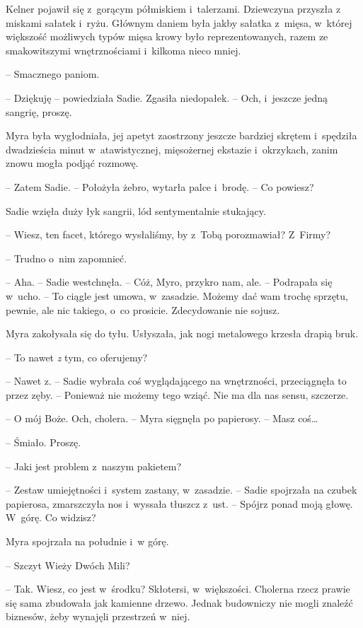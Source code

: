 \documentclass[oneside,polish,11pt,sfheadings]{mwbk}
\begin{document}
Kelner pojawił się z~gorącym półmiskiem i~talerzami. Dziewczyna przyszła
z miskami sałatek i~ryżu. Głównym daniem była jakby sałatka z~mięsa, w~której większość możliwych typów mięsa krowy było reprezentowanych, razem ze
smakowitszymi wnętrznościami i~kilkoma nieco mniej.

-- Smacznego paniom.

-- Dziękuję -- powiedziała Sadie. Zgasiła niedopałek. -- Och, i~jeszcze
jedną sangrię, proszę.

Myra była wygłodniała, jej apetyt zaostrzony jeszcze bardziej skrętem i~spędziła dwadzieścia minut w~atawistycznej, mięsożernej ekstazie i~okrzykach, zanim znowu mogła podjąć rozmowę.

-- Zatem Sadie. -- Położyła żebro, wytarła palce i~brodę. -- Co powiesz?

Sadie wzięła duży łyk sangrii, lód sentymentalnie stukający.

-- Wiesz, ten facet, którego wysłaliśmy, by z~Tobą porozmawiał? Z~Firmy?

-- Trudno o~nim zapomnieć.

-- Aha. -- Sadie westchnęła. -- Cóż, Myro, przykro nam, ale. -- Podrapała
się w~ucho. -- To ciągle jest umowa, w~zasadzie. Możemy dać wam trochę
sprzętu, pewnie, ale nic takiego, o~co prosicie. Zdecydowanie nie
sojusz.

Myra zakołysała się do tyłu. Usłyszała, jak nogi metalowego krzesła
drapią bruk.

-- To nawet \textit{z} tym, co oferujemy?

-- Nawet z. -- Sadie wybrała coś wyglądającego na wnętrzności,
przeciągnęła to przez zęby. -- Ponieważ nie możemy tego wziąć. Nie ma dla
nas sensu, szczerze.

-- O mój Boże. Och, cholera. -- Myra sięgnęła po papierosy. -- Masz coś\ldots

-- Śmiało. Proszę.

-- Jaki jest problem z~naszym pakietem?

-- Zestaw umiejętności i~system zastany, w~zasadzie. -- Sadie spojrzała na
czubek papierosa, zmarszczyła nos i~wyssała tłuszcz z~ust. -- Spójrz
ponad moją głowę. W~górę. Co widzisz?

Myra spojrzała na południe i~w górę.

-- Szczyt Wieży Dwóch Mili?

-- Tak. Wiesz, co jest w~środku? Skłotersi, w~większości. Cholerna rzecz
prawie się sama zbudowała jak kamienne drzewo. Jednak budowniczy nie
mogli znaleźć biznesów, żeby wynajęli przestrzeń w~niej.
\end{document}
